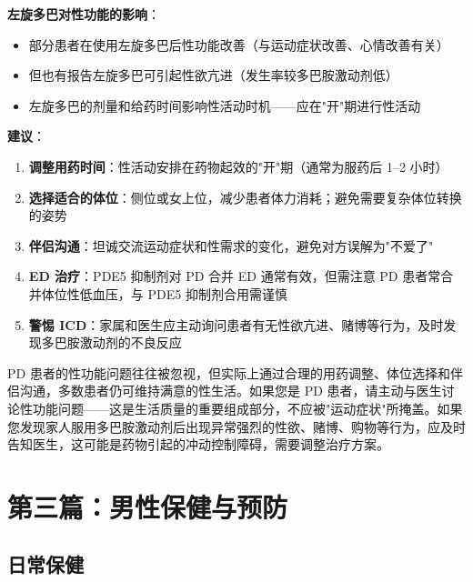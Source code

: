\begin{enumerate}
\vspace{0.5em}
\noindent\textbf{左旋多巴对性功能的影响}：

\begin{itemize}[leftmargin=2cm]
	\item 部分患者在使用左旋多巴后性功能改善（与运动症状改善、心情改善有关）
	\item 但也有报告左旋多巴可引起性欲亢进（发生率较多巴胺激动剂低）
	\item 左旋多巴的剂量和给药时间影响性活动时机——应在"开"期进行性活动
\end{itemize}

\vspace{0.5em}
\noindent\textbf{建议}：

\begin{enumerate}
	\item \textbf{调整用药时间}：性活动安排在药物起效的"开"期（通常为服药后 1--2 小时）
	\item \textbf{选择适合的体位}：侧位或女上位，减少患者体力消耗；避免需要复杂体位转换的姿势
	\item \textbf{伴侣沟通}：坦诚交流运动症状和性需求的变化，避免对方误解为"不爱了"
	\item \textbf{ED 治疗}：PDE5 抑制剂对 PD 合并 ED 通常有效，但需注意 PD 患者常合并体位性低血压，与 PDE5 抑制剂合用需谨慎
	\item \textbf{警惕 ICD}：家属和医生应主动询问患者有无性欲亢进、赌博等行为，及时发现多巴胺激动剂的不良反应
\end{enumerate}

\begin{tcolorbox}[colback=pink!5!white,colframe=red!50!black,title=贴心小叮咛]
PD 患者的性功能问题往往被忽视，但实际上通过合理的用药调整、体位选择和伴侣沟通，多数患者仍可维持满意的性生活。如果您是 PD 患者，请主动与医生讨论性功能问题——这是生活质量的重要组成部分，不应被"运动症状"所掩盖。如果您发现家人服用多巴胺激动剂后出现异常强烈的性欲、赌博、购物等行为，应及时告知医生，这可能是药物引起的冲动控制障碍，需要调整治疗方案。
\end{tcolorbox}

\part{第三篇：男性保健与预防}

\chapter{日常保健}


\end{enumerate}
